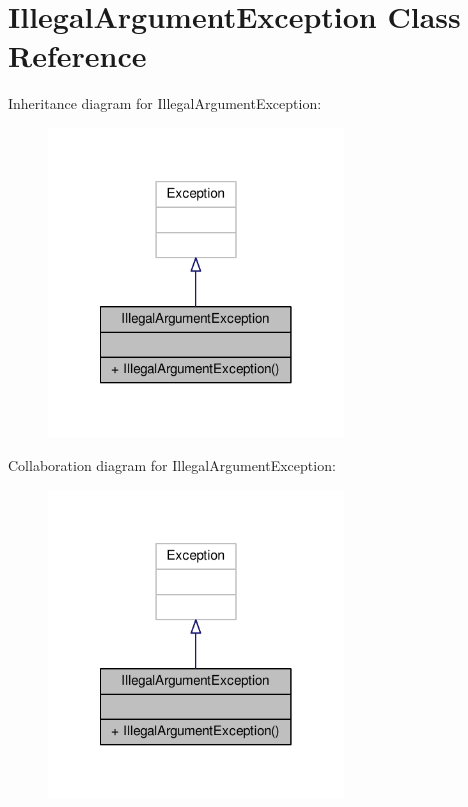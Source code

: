 \hypertarget{classIllegalArgumentException}{\section{Illegal\-Argument\-Exception Class Reference}
\label{classIllegalArgumentException}
}


Inheritance diagram for Illegal\-Argument\-Exception\-:
\nopagebreak
\begin{figure}[H]
\begin{center}
\leavevmode
\includegraphics[width=222pt]{classIllegalArgumentException__inherit__graph}
\end{center}
\end{figure}


Collaboration diagram for Illegal\-Argument\-Exception\-:
\nopagebreak
\begin{figure}[H]
\begin{center}
\leavevmode
\includegraphics[width=222pt]{classIllegalArgumentException__coll__graph}
\end{center}
\end{figure}
